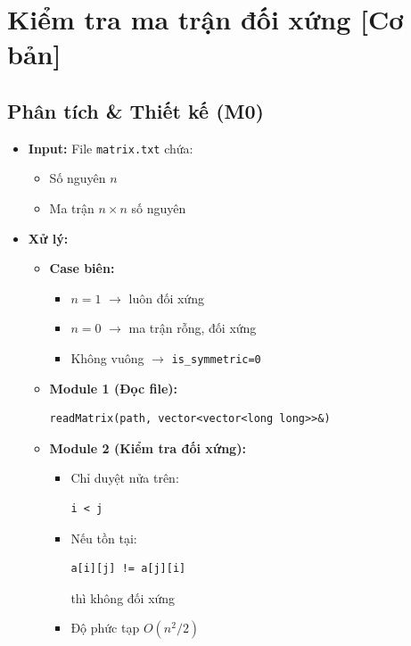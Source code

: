 \section{Kiểm tra ma trận đối xứng [Cơ bản]}
\subsection{Phân tích \& Thiết kế (M0)}

\begin{itemize}
    \item \textbf{Input:}  
    File \texttt{matrix.txt} chứa:
    \begin{itemize}
        \item Số nguyên $n$
        \item Ma trận $n \times n$ số nguyên
    \end{itemize}

    \item \textbf{Xử lý:}
    \begin{itemize}
        \item \textbf{Case biên:}
        \begin{itemize}
            \item $n=1$ $\rightarrow$ luôn đối xứng
            \item $n=0$ $\rightarrow$ ma trận rỗng, đối xứng
            \item Không vuông $\rightarrow$ \texttt{is\_symmetric=0}
        \end{itemize}

        \item \textbf{Module 1 (Đọc file):}
\begin{lstlisting}
readMatrix(path, vector<vector<long long>>&)
\end{lstlisting}

        \item \textbf{Module 2 (Kiểm tra đối xứng):}
        \begin{itemize}
            \item Chỉ duyệt nửa trên:
\begin{lstlisting}
i < j
\end{lstlisting}
            \item Nếu tồn tại:
\begin{lstlisting}
a[i][j] != a[j][i]
\end{lstlisting}
            thì không đối xứng
            \item Độ phức tạp $O(n^2/2)$
        \end{itemize}


\end{itemize}
\end{itemize}
